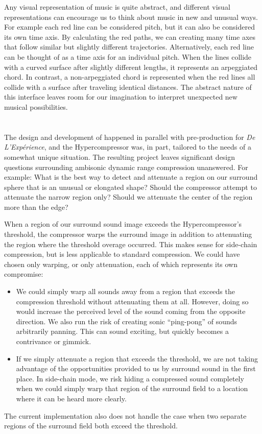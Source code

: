 Any visual representation of music is quite abstract, and different
visual representations can encourage us to think about music in new
and unusual ways. For example each red line can be considered pitch,
but it can also be considered its own time axis. By calculating the
red paths, we can creating many time axes that follow similar but
slightly different trajectories. Alternatively, each red line can be thought of as a
time axis for an individual pitch. When the lines collide with a
curved surface after slightly different lengths, it represents an
arpeggiated chord. In contrast, a non-arpeggiated chord is represented
when the red lines all collide with a surface after traveling
identical distances. The abstract nature of this interface leaves room
for our imagination to interpret unexpected new musical
possibilities. 


\section{\thesis}
The design and development of \thesis happened in parallel with
pre-production for \textit{De L'Exp\'{e}rience}, and the
Hypercompressor was, in part, tailored to the needs of a somewhat
unique situation. The resulting project leaves significant design
questions surrounding ambisonic dynamic range compression unanswered.
For example: What is the best way to detect and attenuate a region on
our surround sphere that is an unusual or elongated shape?  Should the
compressor attempt to attenuate the narrow region only?  Should we
attenuate the center of the region more than the edge?


When a region of our surround sound image exceeds the
Hypercompressor's threshold, the compressor warps the surround image
in addition to attenuating the region where the threshold overage
occurred. This makes sense for side-chain compression, but is less
applicable to standard compression. We could have chosen only
warping, or only attenuation, each of which represents its own
compromise:
\begin{itemize}
\item We could simply warp all sounds away from a region that exceeds
  the compression threshold without attenuating them at all. However,
  doing so would increase the perceived level of the sound coming from
  the opposite direction. We also run the risk of creating sonic
  ``ping-pong'' of sounds arbitrarily panning. This can sound
  exciting, but quickly becomes a contrivance or gimmick. 
\item If we simply attenuate a region that exceeds the threshold, we
  are not taking advantage of the opportunities provided to us by
  surround sound in the first place. In side-chain mode, we risk
  hiding a compressed sound completely when we could simply warp that
  region of the surround field to a location where it can be heard
  more clearly.
\end{itemize}
The current implementation also does not handle the case when two
separate regions of the surround field both exceed the threshold.

